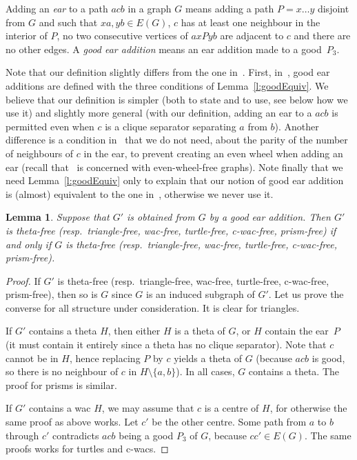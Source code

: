 \documentclass[11pt]{article}
\newtheorem{lemma}[theo]{Lemma}
\newcommand{\sm}{\setminus}
\begin{document}
Adding an \emph{ear} to a path $acb$ in a graph $G$ means adding a path $P= x\dots y$ disjoint from $G$ and such that $xa, yb \in E(G)$, $c$ has at least one neighbour in the interior of $P$, no two consecutive vertices of $axPyb$ are adjacent to $c$ and there are no other edges.  
A \emph{good ear addition} means an ear addition made to a good~$P_3$.  


Note that our definition slightly differs from the one in~\cite{DBLP:journals/jgt/ConfortiCKV00}.  
First, in~\cite{DBLP:journals/jgt/ConfortiCKV00}, good ear additions are defined with the three conditions of Lemma~\ref{l:goodEquiv}.  
We believe that our definition is simpler (both to state and to use, see below how we use it) and slightly more general (with our definition, adding an ear to a $acb$ is permitted even when $c$ is a clique separator separating $a$ from $b$). 
Another difference is a condition in~\cite{DBLP:journals/jgt/ConfortiCKV00} that we do not need, about the parity of the number of neighbours of $c$ in the ear, to prevent creating an even wheel when adding an ear (recall that~\cite{DBLP:journals/jgt/ConfortiCKV00} is concerned with even-wheel-free graphs).
Note finally that we need Lemma~\ref{l:goodEquiv} only to explain that our notion of good ear addition is (almost) equivalent to the one in~\cite{DBLP:journals/jgt/ConfortiCKV00}, otherwise we never use it. 
 



\begin{lemma}
  \label{l:earPreserve}
  Suppose that $G'$ is obtained from $G$ by a good ear addition. 
  Then $G'$ is theta-free (resp.\ triangle-free, wac-free, turtle-free, c-wac-free, prism-free) if and only if $G$ is theta-free (resp.\ triangle-free, wac-free, turtle-free, c-wac-free, prism-free).
\end{lemma}

\begin{proof}
  If $G'$ is theta-free (resp.\ triangle-free, wac-free, turtle-free, c-wac-free, prism-free), then so is  $G$ since $G$ is an induced subgraph of $G'$.  
  Let us prove the converse for all structure under consideration. 
  It is clear for triangles. 
  
  If $G'$ contains a theta $H$, then either $H$ is a theta of $G$, or $H$ contain the ear~$P$ (it must contain it entirely since a theta has no clique separator).  
  Note that $c$ cannot be in $H$, hence replacing $P$ by $c$ yields a theta of $G$ (because $acb$ is good, so there is no neighbour of $c$ in $H \sm \{a, b\}$).   
  In all cases, $G$ contains a theta.
  The proof for prisms is similar. 
  
  If $G'$ contains a wac $H$, we may assume that $c$ is a centre of $H$, for otherwise the same proof as above works. 
  Let $c'$ be the other centre. Some path from $a$ to $b$ through $c'$ contradicts $acb$ being a good $P_3$ of $G$, because $cc'\in E(G)$.  The same proofs works for turtles and c-wacs.  
\end{proof}
\end{document}
